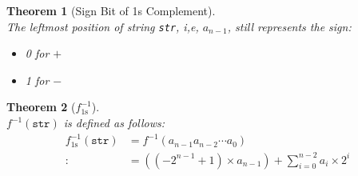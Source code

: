 \documentclass[12pt]{article}
\newtheorem{theorem}{Theorem}[section]
\theoremstyle{definition}
\begin{document}
\begin{theorem}[Sign Bit of 1s Complement]
\hfill\\\normalfont The leftmost position of string \texttt{str}, i,e, $a_{n-1}$, still represents the sign:
\begin{itemize}
  \item 0 for $+$
  \item 1 for $-$
\end{itemize}
\end{theorem}
\begin{theorem}[$f^{-1}_\text{1s}$]
\hfill\\\normalfont $f^{-1}(\texttt{str})$ is defined as follows:
\begin{align*}
f^{-1}_{\text{1s}}(\texttt{str})&=f^{-1}(a_{n-1}a_{n-2}\cdots a_0)\\
:&=((-2^{n-1}+1)\times a_{n-1})+\sum_{i=0}^{n-2}a_i\times 2^i
\end{align*}
\end{theorem}
\end{document}

